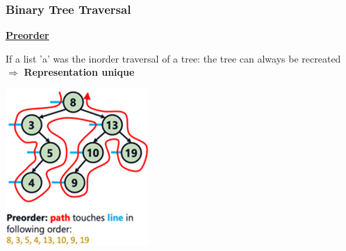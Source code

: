     \subsubsection{Binary Tree Traversal}
        {\centering\underline{\textbf{Preorder}} \par}
            \begin{minipage}{0.49\linewidth}
                
                If a list 'a' was the inorder traversal of a tree: the tree can always be recreated\\
                $\Rightarrow$ \textbf{Representation unique}
            \end{minipage}
            \begin{minipage}{0.49\linewidth}
                {\centering \includegraphics[width = 0.85\linewidth]{src/5_data_structure/images/preorder.png} \par}
            \end{minipage}

